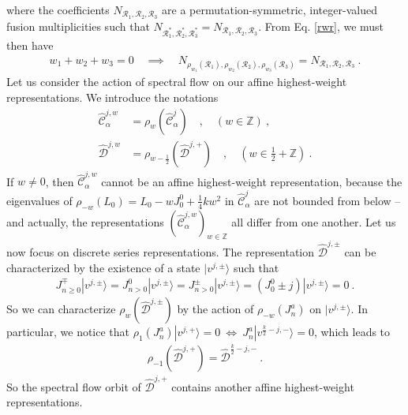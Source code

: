 \documentclass[12pt, a4paper, notitlepage, twoside]{report}
\numberwithin{equation}{section}
\theoremstyle{break}
\begin{document}
where the coefficients $N_{\mathcal{R}_1,\mathcal{R}_2,\mathcal{R}_3}$ are a permutation-symmetric, integer-valued fusion multiplicities such that $N_{\mathcal{R}_1^*,\mathcal{R}_2^*,\mathcal{R}_3^*}=N_{\mathcal{R}_1,\mathcal{R}_2,\mathcal{R}_3}$.
From Eq. \eqref{rwr}, we must then have 
\begin{align}
w_1+w_2+w_3=0 \quad \implies \quad N_{\rho_{w_1}(\mathcal{R}_1),\rho_{w_2}(\mathcal{R}_2),\rho_{w_3}(\mathcal{R}_3)}=N_{\mathcal{R}_1,\mathcal{R}_2,\mathcal{R}_3}\ .
\label{nrrr} 
\end{align}
Let us consider the action of spectral flow on our affine highest-weight representations. 
We introduce the notations 
\begin{align}
 \hat{\mathcal{C}}^{j,w}_\alpha &= \rho_w(\hat{\mathcal{C}}^j_\alpha) \quad , \quad (w\in{\mathbb{Z}})\ ,
\\
\hat{\mathcal{D}}^{j,w} &= \rho_{w-\frac12}(\hat{\mathcal{D}}^{j,+})\quad , \quad (w\in \tfrac12+{\mathbb{Z}})\ .
\end{align}
If $w\neq 0$, then $\hat{\mathcal{C}}^{j,w}_\alpha$ cannot be an affine highest-weight representation, because the eigenvalues of $\rho_{-w}(L_0) = L_0-w J^0_0 +\frac14 kw^2$ in $\hat{\mathcal{C}}^j_\alpha$ are not bounded from below -- and actually, the representations $(\hat{\mathcal{C}}^{j,w}_\alpha)_{w\in{\mathbb{Z}}}$ all differ from one another.
Let us now focus on discrete series representations.
The representation $\hat{\mathcal{D}}^{j,\pm}$ can be characterized by the existence of a state $|v^{j,\pm}\rangle$ such that 
\begin{align}
J^\mp_{n\geq 0}|v^{j,\pm}\rangle = J^0_{n>0}|v^{j,\pm}\rangle =  J^\pm_{n>0}|v^{j,\pm}\rangle = (J^0_0\pm j)|v^{j,\pm}\rangle = 0\ .
\end{align}
So we can characterize $\rho_w(\hat{\mathcal{D}}^{j,\pm})$ by the action of $\rho_{-w}(J^a_n)$ on $|v^{j,\pm}\rangle$.
In particular, we notice that $\rho_1(J^a_n)|v^{j,+}\rangle = 0 \ \iff \ J^a_n|v^{\frac{k}{2}-j,-}\rangle=0$, which leads to 
\begin{align}
 \rho_{-1}(\hat{\mathcal{D}}^{j,+}) = \hat{\mathcal{D}}^{\frac{k}{2}-j,-} \ .
\label{rdd}
\end{align}
So the spectral flow orbit of $\hat{\mathcal{D}}^{j,+}$ contains another affine highest-weight representations.
\end{document}
